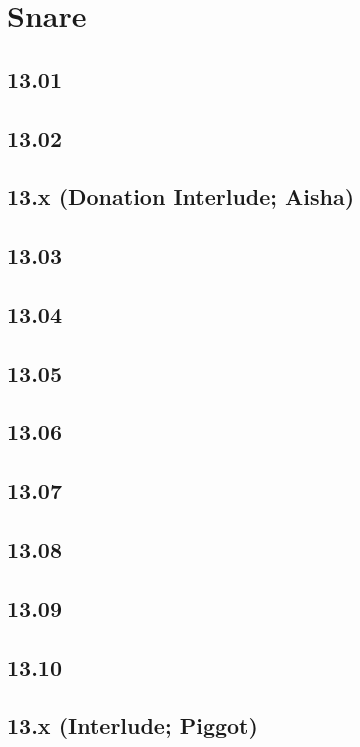 \part{Snare}
 \chapter{13.01}
 \chapter{13.02}
 \chapter{13.x (Donation Interlude; Aisha)}
 \chapter{13.03}
 \chapter{13.04}
 \chapter{13.05}
 \chapter{13.06}
 \chapter{13.07}
 \chapter{13.08}
 \chapter{13.09}
 \chapter{13.10}
 \chapter{13.x (Interlude; Piggot)}













